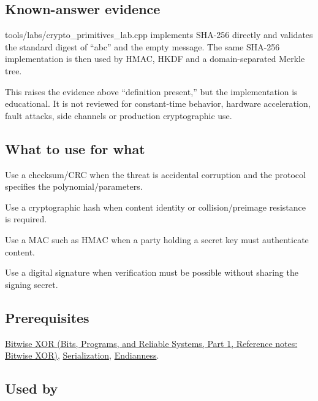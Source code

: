 \subsection{Known-answer evidence}\label{appendix-ed338677de0a-known-answer-evidence}

\hypertarget{appendix-ed338677de0a-known-answer-evidence}{}

tools/labs/crypto\_primitives\_lab.cpp implements SHA-256 directly and validates the standard digest of ``abc'' and the empty message. The same SHA-256 implementation is then used by HMAC, HKDF and a domain-separated Merkle tree.

This raises the evidence above ``definition present,'' but the implementation is educational. It is not reviewed for constant-time behavior, hardware acceleration, fault attacks, side channels or production cryptographic use.

\subsection{What to use for what}\label{appendix-ed338677de0a-what-to-use-for-what}

\hypertarget{appendix-ed338677de0a-what-to-use-for-what}{}

Use a checksum/CRC when the threat is accidental corruption and the protocol specifies the polynomial/parameters.

Use a cryptographic hash when content identity or collision/preimage resistance is required.

Use a MAC such as HMAC when a party holding a secret key must authenticate content.

Use a digital signature when verification must be possible without sharing the signing secret.

\subsection{Prerequisites}\label{appendix-ed338677de0a-prerequisites}

\hypertarget{appendix-ed338677de0a-prerequisites}{}

\href{../01-Bits-Programs-and-Reliable-Systems-P01/main.pdf\#appendix-d49161831368}{Bitwise XOR (Bits, Programs, and Reliable Systems, Part 1, Reference notes: Bitwise XOR)}, \hyperref[appendix-91d09ebed979]{Serialization}, \hyperref[appendix-bc07c3d25b18]{Endianness}.

\subsection{Used by}\label{appendix-ed338677de0a-used-by}

